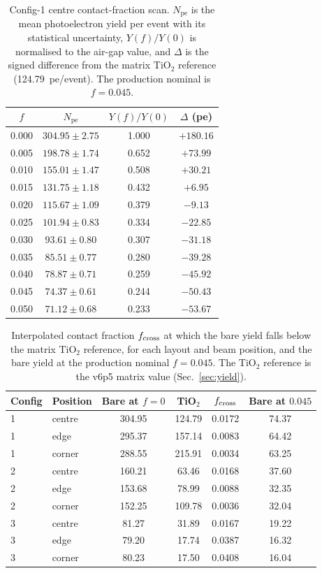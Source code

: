 \documentclass[11pt,a4paper]{article}
\newcommand{\pe}{\ensuremath{N_{\mathrm{pe}}}}
\begin{document}
\begin{table}[H]
\centering
\caption{Config-1 centre contact-fraction scan. $\pe$ is the mean
photoelectron yield per event with its statistical uncertainty, $Y(f)/Y(0)$ is
normalised to the air-gap value, and $\Delta$ is the signed difference from the
matrix TiO$_2$ reference (\num{124.79}~pe/event). The production nominal is
$f=\num{0.045}$.}
\label{tab:contact}
\small
\begin{tabular}{@{}cccc@{}}
\toprule
$f$ & $\pe$ & $Y(f)/Y(0)$ & $\Delta$ (pe) \\
\midrule
0.000 & $304.95 \pm 2.75$ & 1.000 & $+180.16$ \\
0.005 & $198.78 \pm 1.74$ & 0.652 & $+73.99$ \\
0.010 & $155.01 \pm 1.47$ & 0.508 & $+30.21$ \\
0.015 & $131.75 \pm 1.18$ & 0.432 & $+6.95$ \\
0.020 & $115.67 \pm 1.09$ & 0.379 & $-9.13$ \\
0.025 & $101.94 \pm 0.83$ & 0.334 & $-22.85$ \\
0.030 & $93.61 \pm 0.80$ & 0.307 & $-31.18$ \\
0.035 & $85.51 \pm 0.77$ & 0.280 & $-39.28$ \\
0.040 & $78.87 \pm 0.71$ & 0.259 & $-45.92$ \\
0.045 & $74.37 \pm 0.61$ & 0.244 & $-50.43$ \\
0.050 & $71.12 \pm 0.68$ & 0.233 & $-53.67$ \\
\bottomrule
\end{tabular}
\end{table}

\begin{table}[H]
\centering
\caption{Interpolated contact fraction $f_{\rm cross}$ at which the bare yield
falls below the matrix TiO$_2$ reference, for each layout and beam position,
and the bare yield at the production nominal $f=\num{0.045}$. The TiO$_2$
reference is the v6p5 matrix value (Sec.~\ref{sec:yield}).}
\label{tab:contactcross}
\small
\begin{tabular}{@{}llcccc@{}}
\toprule
Config & Position & Bare at $f=0$ & TiO$_2$ & $f_{\rm cross}$ & Bare at $0.045$ \\
\midrule
1 & centre & 304.95 & 124.79 & 0.0172 & 74.37 \\
1 & edge   & 295.37 & 157.14 & 0.0083 & 64.42 \\
1 & corner & 288.55 & 215.91 & 0.0034 & 63.25 \\
2 & centre & 160.21 & 63.46  & 0.0168 & 37.60 \\
2 & edge   & 153.68 & 78.99  & 0.0088 & 32.35 \\
2 & corner & 152.25 & 109.78 & 0.0036 & 32.04 \\
3 & centre & 81.27  & 31.89  & 0.0167 & 19.22 \\
3 & edge   & 79.20  & 17.74  & 0.0387 & 16.32 \\
3 & corner & 80.23  & 17.50  & 0.0408 & 16.04 \\
\bottomrule
\end{tabular}
\end{table}
\end{document}
